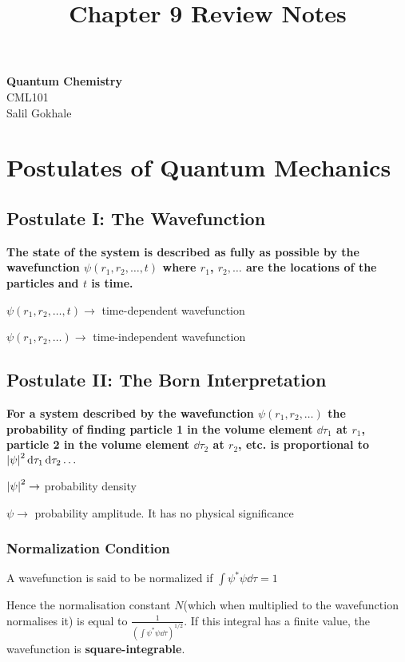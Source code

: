 \documentclass[11pt]{article}
\theoremstyle{definition}
\begin{document}
\setcounter{section}{8}
\title{Chapter 9 Review Notes}

\thispagestyle{empty}

\begin{center}
{\LARGE \bf Quantum Chemistry}\\
{\large CML101}\\
Salil Gokhale
\end{center}

\section{Postulates of Quantum Mechanics}
\subsection{Postulate I: The Wavefunction}

\textbf{The state of the system is described as fully as possible by the wavefunction $\psi(r_1, r_2,\dots ,t)$ where $r_1$, $r_2, \dots$ are the locations of the particles and $t$ is time.}

$\psi(r_1, r_2,\dots ,t) \rightarrow$ time-dependent wavefunction

$\psi(r_1, r_2,\dots) \rightarrow$ time-independent wavefunction

\subsection{Postulate II: The Born Interpretation} 
\textbf{For a system described by the wavefunction $\psi(r_1, r_2, \dots)$ the probability of finding particle 1 in the volume element $\dd{\tau_1}$ at $r_1$, particle 2 in the volume element $\dd{\tau_2}$ at $r_2$, etc. is proportional to $\abs{\psi}^2 \dd{\tau_1} \dd{\tau_2} \dots$}

$\abs{\psi}^2 \rightarrow$ probability density

$\psi \rightarrow$ probability amplitude. It has no physical significance 

\subsubsection{Normalization Condition} 

A wavefunction is said to be normalized if $\int \psi^* \psi \dd{\tau} =1$

Hence the normalisation constant $N$(which when multiplied to the wavefunction normalises it) is equal to $\frac{1}{\left(\int \psi^* \psi \dd{\tau} \right)^{1/2}}$. If this integral has a finite value, the wavefunction is \textbf{square-integrable}.
\end{document}
